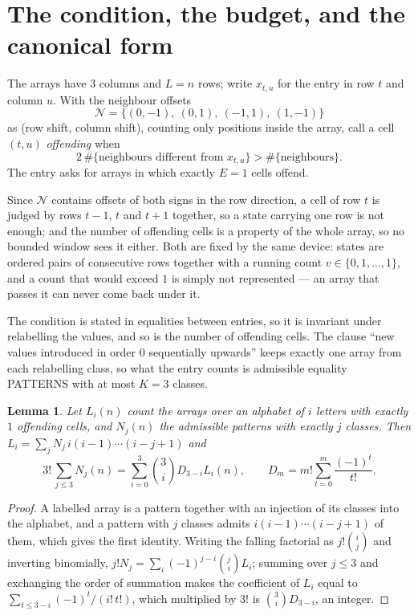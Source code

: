 \documentclass[11pt,a4paper]{article}
\theoremstyle{plain}
\newtheorem{lemma}[theorem]{Lemma}
\theoremstyle{definition}
\begin{document}
\section{The condition, the budget, and the canonical form}

The arrays have $3$ columns and $L=n$ rows; write $x_{t,u}$ for the entry in
row $t$ and column $u$. With the neighbour offsets
\[
\mathcal N=\{(0,-1),\ (0,1),\ (-1,1),\ (1,-1)\}
\]
as (row shift, column shift), counting only positions inside the array, call a cell
$(t,u)$ \emph{offending} when
\[
2\,\#\{\text{neighbours different from }x_{t,u}\}>\#\{\text{neighbours}\} .
\]
The entry asks for arrays in which exactly $E=1$ cells offend.

Since $\mathcal N$ contains offsets of both signs in the row direction, a cell of row
$t$ is judged by rows $t-1$, $t$ and $t+1$ together, so a state carrying one row is not
enough; and the number of offending cells is a property of the whole array, so no bounded
window sees it either. Both are fixed by the same device: states are ordered pairs of
consecutive rows together with a running count $v\in\{0,1,\dots,1\}$, and a count that
would exceed $1$ is simply not represented --- an array that passes it can never come back
under it.

The condition is stated in equalities between entries, so it is invariant under relabelling
the values, and so is the number of offending cells. The clause ``new values introduced in
order $0$ sequentially upwards'' keeps exactly one array from each relabelling class, so what
the entry counts is admissible equality PATTERNS with at most $K=3$ classes.

\begin{lemma}\label{lem:inv}
Let $L_i(n)$ count the arrays over an alphabet of $i$ letters with exactly $1$ offending
cells, and $N_j(n)$ the admissible patterns with exactly $j$ classes. Then
$L_i=\sum_j N_j\,i(i-1)\cdots(i-j+1)$ and
\[
3!\,\sum_{j\le3}N_j(n)=\sum_{i=0}^{3}\binom{3}{i}D_{3-i}L_i(n),
\qquad D_m=m!\sum_{t=0}^{m}\frac{(-1)^t}{t!} .
\]
\end{lemma}

\begin{proof}
A labelled array is a pattern together with an injection of its classes into the alphabet,
and a pattern with $j$ classes admits $i(i-1)\cdots(i-j+1)$ of them, which gives the first
identity. Writing the falling factorial as $j!\binom{i}{j}$ and inverting binomially,
$j!N_j=\sum_i(-1)^{j-i}\binom{j}{i}L_i$; summing over $j\le3$ and exchanging the
order of summation makes the coefficient of $L_i$ equal to
$\sum_{t\le3-i}(-1)^t/(i!\,t!)$, which multiplied by $3!$ is
$\binom{3}{i}D_{3-i}$, an integer.
\end{proof}
\end{document}
